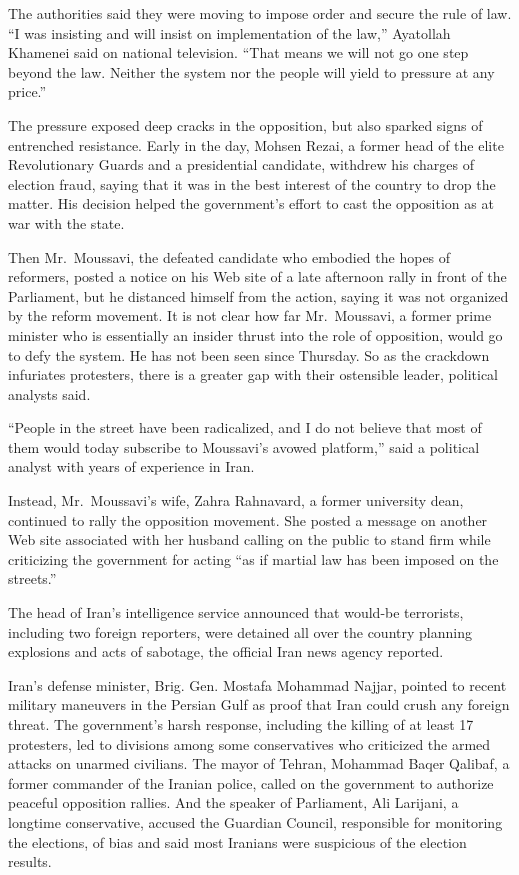 ﻿\documentclass[12pt]{article}
\begin{document}
The authorities said they were moving to impose order and secure the rule of law. ``I was insisting
and will insist on implementation of the law,'' Ayatollah Khamenei said on national television.
``That means we will not go one step beyond the law. Neither the system nor the people will yield to
pressure at any price.''

The pressure exposed deep cracks in the opposition, but also sparked signs of entrenched resistance.
Early in the day, Mohsen Rezai, a former head of the elite Revolutionary Guards and a presidential
candidate, withdrew his charges of election fraud, saying that it was in the best interest of the
country to drop the matter. His decision helped the government's effort to cast the opposition as at
war with the state.

Then Mr.~Moussavi, the defeated candidate who embodied the hopes of reformers, posted a notice on
his Web site of a late afternoon rally in front of the Parliament, but he distanced himself from the
action, saying it was not organized by the reform movement. It is not clear how far Mr.~Moussavi, a
former prime minister who is essentially an insider thrust into the role of opposition, would go to
defy the system. He has not been seen since Thursday. So as the crackdown infuriates protesters,
there is a greater gap with their ostensible leader, political analysts said.

``People in the street have been radicalized, and I do not believe that most of them would today
subscribe to Moussavi's avowed platform,'' said a political analyst with years of experience in
Iran.

Instead, Mr.~Moussavi's wife, Zahra Rahnavard, a former university dean, continued to rally the
opposition movement. She posted a message on another Web site associated with her husband calling on
the public to stand firm while criticizing the government for acting ``as if martial law has been
imposed on the streets.''

The head of Iran's intelligence service announced that would-be terrorists, including two foreign
reporters, were detained all over the country planning explosions and acts of sabotage, the official
Iran news agency reported.

Iran's defense minister, Brig. Gen. Mostafa Mohammad Najjar, pointed to recent military maneuvers in
the Persian Gulf as proof that Iran could crush any foreign threat. The government's harsh response,
including the killing of at least 17 protesters, led to divisions among some conservatives who
criticized the armed attacks on unarmed civilians. The mayor of Tehran, Mohammad Baqer Qalibaf, a
former commander of the Iranian police, called on the government to authorize peaceful opposition
rallies. And the speaker of Parliament, Ali Larijani, a longtime conservative, accused the Guardian
Council, responsible for monitoring the elections, of bias and said most Iranians were suspicious of
the election results.
\end{document}

